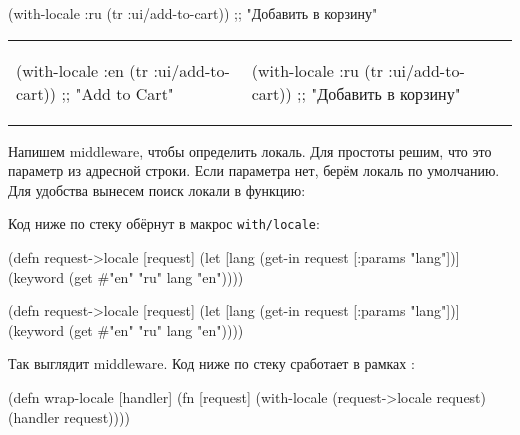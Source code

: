 \splitter

\begin{clojure}
(with-locale :ru
  (tr :ui/add-to-cart))
;; "Добавить в корзину"
\end{clojure}

\else


\noindent
\begin{tabular}{ @{}p{5cm} @{}p{5cm} }

\begin{clojure}
(with-locale :en
  (tr :ui/add-to-cart))
;; "Add to Cart"
\end{clojure}

&

\begin{clojure}
(with-locale :ru
  (tr :ui/add-to-cart))
;; "Добавить в корзину"
\end{clojure}

\end{tabular}


\fi


Напишем middleware, чтобы определить локаль. Для простоты решим, что это
параметр  из адресной строки. Если параметра нет, берём локаль по
умолчанию. Для удобства вынесем поиск локали в функцию:

Код ниже по стеку обёрнут в макрос \texttt{with\-/locale}:

\ifnarrow

\begin{clojure}
(defn request->locale [request]
  (let [lang (get-in request
               [:params "lang"])]
    (keyword
      (get #{"en" "ru"} lang "en"))))
\end{clojure}

\else

\begin{clojure}
(defn request->locale [request]
  (let [lang (get-in request [:params "lang"])]
    (keyword (get #{"en" "ru"} lang "en"))))
\end{clojure}

\fi

Так выглядит middleware. Код ниже по стеку сработает в рамках
:

\ifnarrow

\begin{clojure}
(defn wrap-locale [handler]
  (fn [request]
    (with-locale
      (request->locale request)
      (handler request))))
\end{clojure}

